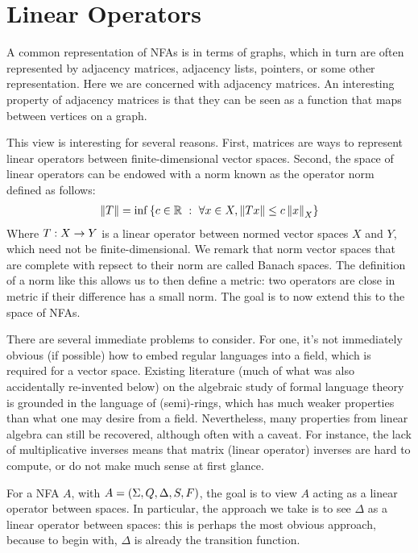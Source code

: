 
\section{Linear Operators}

A common representation of NFAs is in terms of graphs,
which in turn are often represented by adjacency matrices,
adjacency lists, pointers, or some other representation.
Here we are concerned with adjacency matrices.
An interesting property of adjacency matrices is that they can be seen
as a function that maps between vertices on a graph.

This view is interesting for several reasons.
First, matrices are ways to represent linear operators
between finite-dimensional vector spaces.
Second, the space of linear operators can be endowed with a norm
known as the operator norm defined as follows:
\begin{align*}
  \left\lVert T\right\rVert
    = \inf\left\{c \in \mathbb{R} \  : \ 
              \forall x \in X, \left\lVert Tx\right\rVert \leq c \left\lVert x\right\rVert_X\right\}
\end{align*}
Where \(T : X \to Y\) is a linear operator between
normed vector spaces \(X\) and \(Y\), which need not be finite-dimensional.
We remark that norm vector spaces that are complete with repsect to their
norm are called Banach spaces.
The definition of a norm like this allows us to then define a metric:
two operators are close in metric if their difference has a small norm.
The goal is to now extend this to the space of NFAs.

There are several immediate problems to consider.
For one, it's not immediately obvious (if possible) how to embed
regular languages into a field, which is required for a vector space.
Existing literature (much of what was also accidentally re-invented below)
on the algebraic study of formal language theory is grounded
in the language of (semi)-rings,
which has much weaker properties than what one may desire from a field.
Nevertheless, many properties from linear algebra can still be recovered,
although often with a caveat.
For instance, the lack of multiplicative inverses means that
matrix (linear operator) inverses are hard to compute,
or do not make much sense at first glance.

For a NFA \(A\), with \(A = \left(\Sigma, Q, \Delta, S, F\right)\),
the goal is to view \(A\) acting as a linear operator between spaces.
In particular, the approach we take is to see \(\Delta\) as a
linear operator between spaces: this is perhaps the most obvious approach,
because to begin with, \(\Delta\) is already the transition function.

